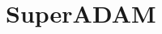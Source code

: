 \documentclass[\main/dresen_thesis.tex]{subfiles}
\begin{document}
\section{SuperADAM}\label{ch:appendix:lss:superadam}
\end{document}
